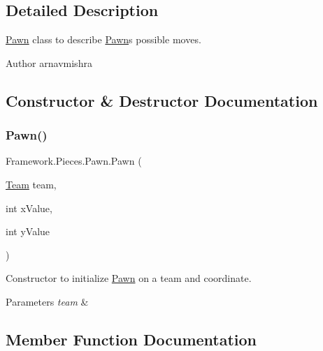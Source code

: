 \subsection{Detailed Description}
\hyperlink{class_framework_1_1_pieces_1_1_pawn}{Pawn} class to describe \hyperlink{class_framework_1_1_pieces_1_1_pawn}{Pawn}\textquotesingle{}s possible moves. \begin{DoxyAuthor}{Author}
arnavmishra 
\end{DoxyAuthor}


\subsection{Constructor \& Destructor Documentation}
\hypertarget{class_framework_1_1_pieces_1_1_pawn_a468f5a838c9a2f68365dc5060f92ce07}{}\label{class_framework_1_1_pieces_1_1_pawn_a468f5a838c9a2f68365dc5060f92ce07} 
\subsubsection{\texorpdfstring{Pawn()}{Pawn()}}
{\footnotesize\ttfamily Framework.\+Pieces.\+Pawn.\+Pawn (\begin{DoxyParamCaption}\item[{\hyperlink{class_framework_1_1_team}{Team}}]{team,  }\item[{int}]{x\+Value,  }\item[{int}]{y\+Value }\end{DoxyParamCaption})}

Constructor to initialize \hyperlink{class_framework_1_1_pieces_1_1_pawn}{Pawn} on a team and coordinate. 
\begin{DoxyParams}{Parameters}
{\em team} & \\
\hline
\end{DoxyParams}


\subsection{Member Function Documentation}
\hypertarget{class_framework_1_1_pieces_1_1_pawn_a05c399a7a14de3df4b4a72dfd06a554a}{}\label{class_framework_1_1_pieces_1_1_pawn_a05c399a7a14de3df4b4a72dfd06a554a} 
